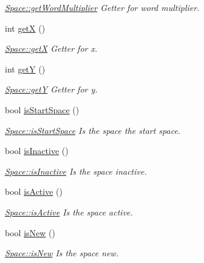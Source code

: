 \begin{DoxyCompactItemize}
\begin{DoxyCompactList}\small\item\em \hyperlink{class_space_a6a26a281a90288d56c83cc76b53cb6fb}{Space\-::get\-Word\-Multiplier} Getter for word multiplier. \end{DoxyCompactList}\item 
int \hyperlink{class_space_a65828dd5c8d2799dadab676c1d52bdfa}{get\-X} ()
\begin{DoxyCompactList}\small\item\em \hyperlink{class_space_a65828dd5c8d2799dadab676c1d52bdfa}{Space\-::get\-X} Getter for x. \end{DoxyCompactList}\item 
int \hyperlink{class_space_ac12e951586a96323b1db8cf1e5a827a9}{get\-Y} ()
\begin{DoxyCompactList}\small\item\em \hyperlink{class_space_ac12e951586a96323b1db8cf1e5a827a9}{Space\-::get\-Y} Getter for y. \end{DoxyCompactList}\item 
bool \hyperlink{class_space_aaa6f84cc3a3877b7fb32e5b2363adb10}{is\-Start\-Space} ()
\begin{DoxyCompactList}\small\item\em \hyperlink{class_space_aaa6f84cc3a3877b7fb32e5b2363adb10}{Space\-::is\-Start\-Space} Is the space the start space. \end{DoxyCompactList}\item 
bool \hyperlink{class_space_a83819948ab0508299c66829ca8335034}{is\-Inactive} ()
\begin{DoxyCompactList}\small\item\em \hyperlink{class_space_a83819948ab0508299c66829ca8335034}{Space\-::is\-Inactive} Is the space inactive. \end{DoxyCompactList}\item 
bool \hyperlink{class_space_a7aec01e1b32d70af2cdc25d298517d6c}{is\-Active} ()
\begin{DoxyCompactList}\small\item\em \hyperlink{class_space_a7aec01e1b32d70af2cdc25d298517d6c}{Space\-::is\-Active} Is the space active. \end{DoxyCompactList}\item 
bool \hyperlink{class_space_aa24aa1c8ac8b6033fc041d79345bac71}{is\-New} ()
\begin{DoxyCompactList}\small\item\em \hyperlink{class_space_aa24aa1c8ac8b6033fc041d79345bac71}{Space\-::is\-New} Is the space new. \end{DoxyCompactList}\item 

\end{DoxyCompactItemize}
